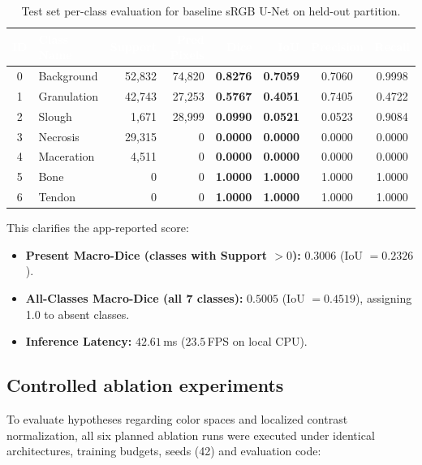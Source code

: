 \documentclass[12pt,a4paper]{article}
\newcommand{\thead}[1]{\cellcolor{navy}\textcolor{white}{\textbf{#1}}}
\begin{document}
\begin{table}[H]\centering\small
\caption{Test set per-class evaluation for baseline sRGB U-Net on held-out partition.}\label{tab:test_metrics}
\begin{tabular}{clrrrrcc}
\toprule
\thead{ID} & \thead{Class Name} & \thead{Support} & \thead{Pred Pixels} & \thead{Dice} & \thead{IoU} & \thead{Precision} & \thead{Recall}\\
\midrule
0 & Background & 52,832 & 74,820 & \textbf{0.8276} & \textbf{0.7059} & 0.7060 & 0.9998\\
1 & Granulation & 42,743 & 27,253 & \textbf{0.5767} & \textbf{0.4051} & 0.7405 & 0.4722\\
2 & Slough & 1,671 & 28,999 & \textbf{0.0990} & \textbf{0.0521} & 0.0523 & 0.9084\\
3 & Necrosis & 29,315 & 0 & \textbf{0.0000} & \textbf{0.0000} & 0.0000 & 0.0000\\
4 & Maceration & 4,511 & 0 & \textbf{0.0000} & \textbf{0.0000} & 0.0000 & 0.0000\\
5 & Bone & 0 & 0 & \textbf{1.0000} & \textbf{1.0000} & 1.0000 & 1.0000\\
6 & Tendon & 0 & 0 & \textbf{1.0000} & \textbf{1.0000} & 1.0000 & 1.0000\\
\bottomrule
\end{tabular}
\end{table}

This clarifies the app-reported score:
\begin{itemize}
\item \textbf{Present Macro-Dice (classes with Support $>0$):} $\mathbf{0.3006}$ (IoU $= 0.2326$).
\item \textbf{All-Classes Macro-Dice (all 7 classes):} $\mathbf{0.5005}$ (IoU $= 0.4519$), assigning 1.0 to absent classes.
\item \textbf{Inference Latency:} $42.61$\,ms ($23.5$\,FPS on local CPU).
\end{itemize}

\subsection{Controlled ablation experiments}
To evaluate hypotheses regarding color spaces and localized contrast normalization, all six planned ablation runs were executed under identical architectures, training budgets, seeds (42) and evaluation code:
\end{document}
